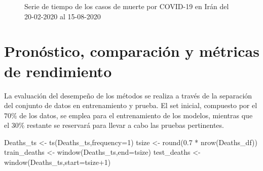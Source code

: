 \documentclass[
  us-letterpaper,
]{scrreprt}
\newenvironment{Shaded}{\begin{snugshade}}{\end{snugshade}}
\newcommand{\AttributeTok}[1]{\textcolor[rgb]{0.40,0.45,0.13}{#1}}
\newcommand{\DecValTok}[1]{\textcolor[rgb]{0.68,0.00,0.00}{#1}}
\newcommand{\FloatTok}[1]{\textcolor[rgb]{0.68,0.00,0.00}{#1}}
\newcommand{\FunctionTok}[1]{\textcolor[rgb]{0.28,0.35,0.67}{#1}}
\newcommand{\NormalTok}[1]{\textcolor[rgb]{0.00,0.23,0.31}{#1}}
\newcommand{\OtherTok}[1]{\textcolor[rgb]{0.00,0.23,0.31}{#1}}
\newcommand{\SpecialCharTok}[1]{\textcolor[rgb]{0.37,0.37,0.37}{#1}}
\theoremstyle{definition}
\theoremstyle{plain}
\theoremstyle{plain}
\theoremstyle{definition}
\theoremstyle{remark}
\begin{document}
\begin{figure}


\caption{\label{fig-muertespdf}Serie de tiempo de los casos de muerte
por COVID-19 en Irán del 20-02-2020 al 15-08-2020}

\end{figure}%

\section{Pronóstico, comparación y métricas de
rendimiento}\label{pronuxf3stico-comparaciuxf3n-y-muxe9tricas-de-rendimiento}

La evaluación del desempeño de los métodos se realiza a través de la
separación del conjunto de datos en entrenamiento y prueba. El set
inicial, compuesto por el \(70\%\) de los datos, se emplea para el
entrenamiento de los modelos, mientras que el \(30\%\) restante se
reservará para llevar a cabo las pruebas pertinentes.

\begin{Shaded}
\begin{Highlighting}[]
\NormalTok{Deaths\_ts }\OtherTok{\textless{}{-}} \FunctionTok{ts}\NormalTok{(Deaths\_ts,}\AttributeTok{frequency=}\DecValTok{1}\NormalTok{) }
\NormalTok{tsize }\OtherTok{\textless{}{-}} \FunctionTok{round}\NormalTok{(}\FloatTok{0.7} \SpecialCharTok{*} \FunctionTok{nrow}\NormalTok{(Deaths\_df)) }
\NormalTok{train\_deaths }\OtherTok{\textless{}{-}} \FunctionTok{window}\NormalTok{(Deaths\_ts,}\AttributeTok{end=}\NormalTok{tsize) }
\NormalTok{test\_deaths }\OtherTok{\textless{}{-}} \FunctionTok{window}\NormalTok{(Deaths\_ts,}\AttributeTok{start=}\NormalTok{tsize}\SpecialCharTok{+}\DecValTok{1}\NormalTok{)}
\end{Highlighting}
\end{Shaded}
\end{document}
